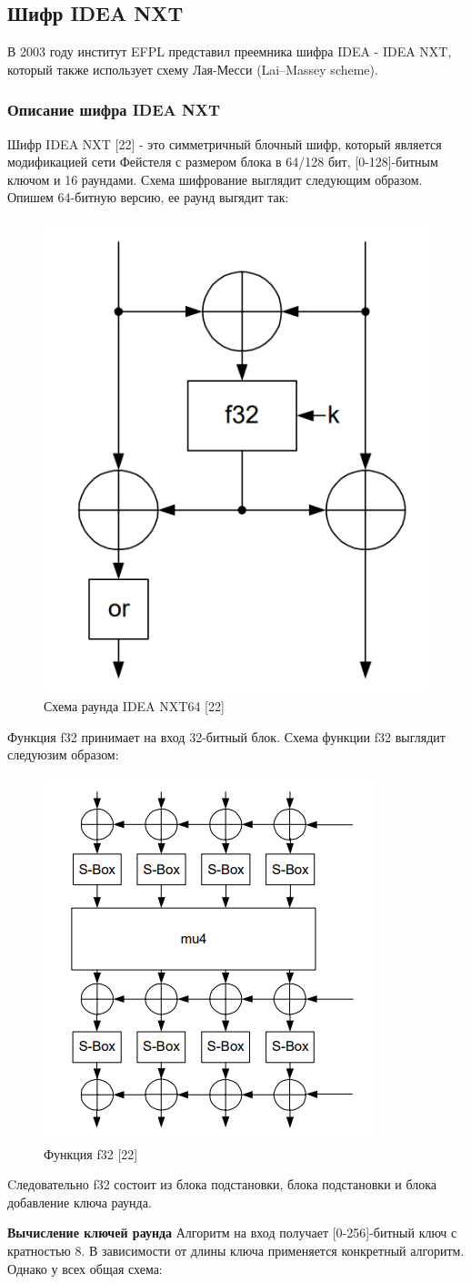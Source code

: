 \documentclass[colorthm]{./civarticle}
\begin{document}
\subsection{Шифр IDEA NXT}
В 2003 году институт EFPL представил преемника шифра IDEA - IDEA NXT, который также использует схему Лая-Месси (Lai–Massey scheme).

\subsubsection{Описание шифра IDEA NXT}
Шифр IDEA NXT [22] - это симметричный блочный шифр, который является модификацией сети Фейстеля с размером блока в 64/128 бит, [0-128]-битным ключом и 16 раундами. Схема шифрование выглядит следующим образом. Опишем 64-битную версию, ее раунд выгядит так:

\begin{figure}[H]
    \centering
    \includegraphics[width=0.25\linewidth]{64_rounds.png}
    \caption{Схема раунда IDEA NXT64 [22]}
    \label{fig:enter-label}
\end{figure}

Функция f32 принимает на вход 32-битный блок. Схема функции f32 выглядит следуюзим образом:

\begin{figure}[H]
    \centering
    \includegraphics[width=0.25\linewidth]{f32.png}
    \caption{Функция f32 [22]}
    \label{fig:enter-label}
\end{figure}

Cледовательно f32 состоит из блока подстановки, блока подстановки и блока добавление ключа раунда.

\textbf{Вычисление ключей раунда}
Алгоритм на вход получает [0-256]-битный ключ с кратностью 8. В зависимости от длины ключа применяется конкретный алгоритм. Однако у всех общая схема: 
\end{document}
